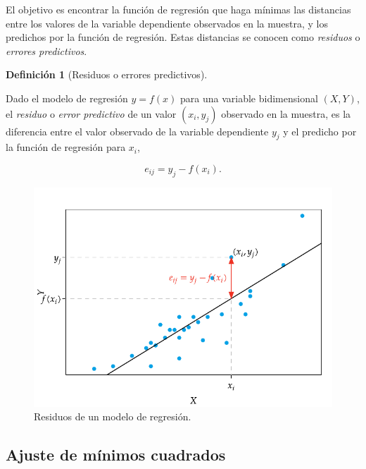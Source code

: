 \documentclass[
  a4paper,
]{scrreport}
\theoremstyle{plain}
\theoremstyle{definition}
\newtheorem{definition}{Definición}[chapter]
\theoremstyle{definition}
\theoremstyle{remark}
\begin{document}
El objetivo es encontrar la función de regresión que haga mínimas las
distancias entre los valores de la variable dependiente observados en la
muestra, y los predichos por la función de regresión. Estas distancias
se conocen como \emph{residuos} o \emph{errores predictivos}.

\begin{definition}[Residuos o errores
predictivos]\protect\hypertarget{def-resiudos}{}\label{def-resiudos}

Dado el modelo de regresión \(y=f(x)\) para una variable bidimensional
\((X,Y)\), el \emph{residuo} o \emph{error predictivo} de un valor
\((x_i,y_j)\) observado en la muestra, es la diferencia entre el valor
observado de la variable dependiente \(y_j\) y el predicho por la
función de regresión para \(x_i\),

\[e_{ij} = y_j-f(x_i).\]

\end{definition}

\begin{figure}[H]

{\centering \includegraphics{img/regresion/residuos_y.pdf}

}

\caption{Residuos de un modelo de regresión.}

\end{figure}%

\subsection{Ajuste de mínimos
cuadrados}\label{ajuste-de-muxednimos-cuadrados}
\end{document}
